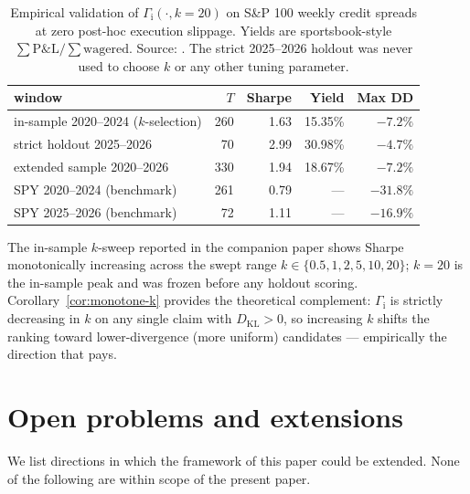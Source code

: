 \documentclass[11pt]{article}
\theoremstyle{definition}
\theoremstyle{remark}
\newcommand{\KL}{D_{\mathrm{KL}}}
\newcommand{\GROUND}{\Gamma_{\mathrm{i}}}
\begin{document}
\begin{table}[htbp]
\centering
\small
\begin{tabular}{lrrrr}
\toprule
window & $T$ & Sharpe & Yield & Max DD \\
\midrule
in-sample 2020--2024 ($k$-selection) & 260 & 1.63 & 15.35\% & $-7.2\%$  \\
strict holdout 2025--2026             &  70 & 2.99 & 30.98\% & $-4.7\%$  \\
extended sample 2020--2026            & 330 & 1.94 & 18.67\% & $-7.2\%$  \\
\midrule
SPY 2020--2024 (benchmark)            & 261 & 0.79 & ---     & $-31.8\%$ \\
SPY 2025--2026 (benchmark)            &  72 & 1.11 & ---     & $-16.9\%$ \\
\bottomrule
\end{tabular}
\caption{Empirical validation of $\GROUND(\cdot, k{=}20)$ on S\&P 100 weekly
credit spreads at zero post-hoc execution slippage. Yields are
sportsbook-style $\sum \mathrm{P\&L} / \sum \mathrm{wagered}$. Source:
\citet{mercurio2026empirical}. The strict 2025--2026 holdout was never
used to choose $k$ or any other tuning parameter.}
\label{tab:empirical}
\end{table}

The in-sample $k$-sweep reported in the companion paper shows Sharpe
monotonically increasing across the swept range $k \in \{0.5, 1, 2, 5,
10, 20\}$; $k = 20$ is the in-sample peak and was frozen before any
holdout scoring. Corollary~\ref{cor:monotone-k} provides the
theoretical complement: $\GROUND$ is strictly decreasing in $k$ on any
single claim with $\KL > 0$, so increasing $k$ shifts the ranking
toward lower-divergence (more uniform) candidates --- empirically the
direction that pays.


\section{Open problems and extensions}\label{sec:open}

We list directions in which the framework of this paper could be
extended. None of the following are within scope of the present paper.
\end{document}
